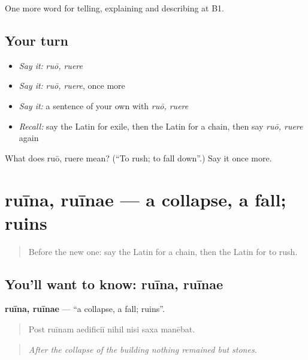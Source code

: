 \begin{grammarlens}[title={What you've built}]
One more word for telling, explaining and describing at B1.
\end{grammarlens}

\subsection*{Your turn}
\begin{itemize}
\raggedright
  \item \emph{Say it:} \emph{ruō, ruere}
  \item \emph{Say it:} \emph{ruō, ruere}, once more
  \item \emph{Say it:} a sentence of your own with \emph{ruō, ruere}
  \item \emph{Recall:} say the Latin for exile, then the Latin for a chain, then say \emph{ruō, ruere} again
\end{itemize}

\begin{tcolorbox}[breakable,colback=teal!4,colframe=teal!35!black,title={Before you move on}]
What does ruō, ruere mean? (\textquotedblleft{}To rush; to fall down\textquotedblright{}.) Say it once more.
\end{tcolorbox}
\section[ruīna, ruīnae]{ruīna, ruīnae — a collapse, a fall; ruins}

\label{lesson:LA-C313-ruina}



\begin{quote}
Before the new one: say the Latin for a chain, then the Latin for to rush.
\end{quote}

\subsection*{You'll want to know: ruīna, ruīnae}
\textbf{ruīna, ruīnae} — \textquotedblleft{}a collapse, a fall; ruins\textquotedblright{}.

\begin{quote}
Post ruīnam aedificiī nihil nisi saxa manēbat.
\end{quote}

\begin{quote}
\emph{After the collapse of the building nothing remained but stones.}
\end{quote}

